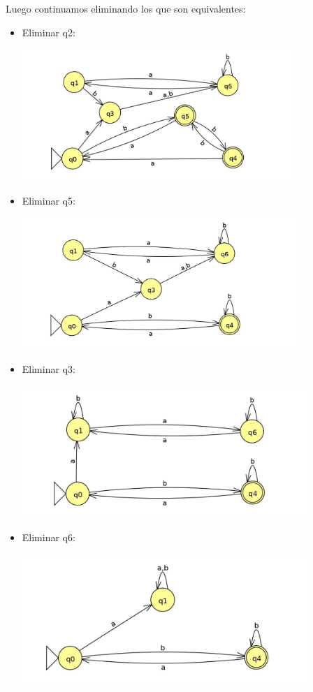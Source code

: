 \documentclass[11pt,letterpaper]{article}
\begin{document}
Luego continuamos eliminando los que son equivalentes:
\newpage
\begin{itemize}
\item{Eliminar q2:}

\includegraphics[height=5cm]{tarea_1-a.png}

\item{Eliminar q5:}

\includegraphics[height=5cm]{tarea_1-a-2.png}

\item{Eliminar q3:}

\includegraphics[height=5cm]{tarea_1-a-3.png}
\newpage
\item{Eliminar q6:}

\includegraphics[height=5cm]{tarea_1-a-4.png}
\end{itemize}
\end{document}
